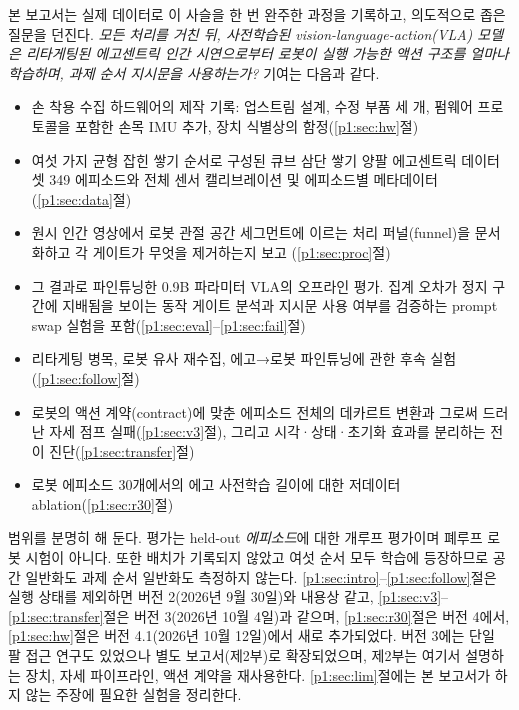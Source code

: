 \documentclass[conference,10pt]{IEEEtran}
\begin{document}
본 보고서는 실제 데이터로 이 사슬을 한 번 완주한 과정을 기록하고, 의도적으로 좁은 질문을 던진다.
\emph{모든 처리를 거친 뒤, 사전학습된 vision-language-action(VLA) 모델은 리타게팅된 에고센트릭 인간 시연으로부터 로봇이 실행 가능한
액션 구조를 얼마나 학습하며, 과제 순서 지시문을 사용하는가?} 기여는 다음과 같다.
\begin{itemize}
\item 손 착용 수집 하드웨어의 제작 기록: 업스트림 설계, 수정 부품 세 개, 펌웨어 프로토콜을 포함한 손목 IMU 추가, 장치 식별상의
함정(\ref{p1:sec:hw}절)
\item 여섯 가지 균형 잡힌 쌓기 순서로 구성된 큐브 삼단 쌓기 양팔 에고센트릭 데이터셋 349 에피소드와 전체 센서 캘리브레이션 및
에피소드별 메타데이터(\ref{p1:sec:data}절)
\item 원시 인간 영상에서 로봇 관절 공간 세그먼트에 이르는 처리 퍼널(funnel)을 문서화하고 각 게이트가 무엇을 제거하는지 보고
(\ref{p1:sec:proc}절)
\item 그 결과로 파인튜닝한 0.9B 파라미터 VLA의 오프라인 평가. 집계 오차가 정지 구간에 지배됨을 보이는 동작 게이트 분석과
지시문 사용 여부를 검증하는 prompt swap 실험을 포함(\ref{p1:sec:eval}--\ref{p1:sec:fail}절)
\item 리타게팅 병목, 로봇 유사 재수집, 에고→로봇 파인튜닝에 관한 후속 실험(\ref{p1:sec:follow}절)
\item 로봇의 액션 계약(contract)에 맞춘 에피소드 전체의 데카르트 변환과 그로써 드러난 자세 점프 실패(\ref{p1:sec:v3}절), 그리고
시각·상태·초기화 효과를 분리하는 전이 진단(\ref{p1:sec:transfer}절)
\item 로봇 에피소드 30개에서의 에고 사전학습 길이에 대한 저데이터 ablation(\ref{p1:sec:r30}절)
\end{itemize}
범위를 분명히 해 둔다. 평가는 held-out \emph{에피소드}에 대한 개루프 평가이며 폐루프 로봇 시험이 아니다. 또한 배치가 기록되지
않았고 여섯 순서 모두 학습에 등장하므로 공간 일반화도 과제 순서 일반화도 측정하지 않는다. \ref{p1:sec:intro}--\ref{p1:sec:follow}절은
실행 상태를 제외하면 버전 2(2026년 9월 30일)와 내용상 같고, \ref{p1:sec:v3}--\ref{p1:sec:transfer}절은 버전 3(2026년 10월 4일)과 같으며,
\ref{p1:sec:r30}절은 버전 4에서, \ref{p1:sec:hw}절은 버전 4.1(2026년 10월 12일)에서 새로 추가되었다. 버전 3에는 단일 팔 접근 연구도 있었으나 별도 보고서(제2부)로 확장되었으며, 제2부는 여기서 설명하는
장치, 자세 파이프라인, 액션 계약을 재사용한다. \ref{p1:sec:lim}절에는 본 보고서가 하지 않는 주장에 필요한 실험을 정리한다.
\end{document}
